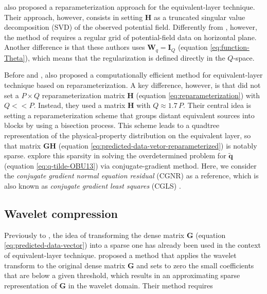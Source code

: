 \cite{mendonca-2020} also proposed a reparameterization approach for the equivalent-layer technique.
Their approach, however, consists in setting $\mathbf{H}$ as a truncated singular value decomposition
(SVD) \cite[e.g.,][p. 55]{aster_etal2019} of the observed potential field. 
Differently from \cite{oliveirajr-etal2013}, however, the method of \cite{mendonca-2020} requires 
a regular grid of potential-field data on horizontal plane.
Another difference is that these authors uses $\mathbf{W}_{q} = \mathbf{I}_{Q}$ (equation \ref{eq:function-Theta}),
which means that the regularization is defined directly in the $Q$-space.

Before \cite{oliveirajr-etal2013} and \cite{mendonca-2020}, \cite{barnes-lumley_2011} also proposed a computationally
efficient method for equivalent-layer technique based on reparameterization. 
A key difference, however, is that \cite{barnes-lumley_2011} did not set a $P \times Q$ reparameterization matrix $\mathbf{H}$
(equation \ref{eq:reparameterization}) with $Q << P$. 
Instead, they used a matrix $\mathbf{H}$ with $Q \approx 1.7 \, P$. 
Their central idea is setting a reparameterization scheme that groups distant equivalent sources into blocks by
using a bisection process. 
This scheme leads to a quadtree representation of the physical-property distribution on the equivalent layer, 
so that matrix $\mathbf{G}\mathbf{H}$ (equation \ref{eq:predicted-data-vetor-reparameterized}) is notably sparse.
\cite{barnes-lumley_2011} explore this sparsity in solving the overdetermined problem for $\tilde{\mathbf{q}}$
(equation \ref{eq:q-tilde-OBU13}) via conjugate-gradient method.
Here, we consider the \textit{conjugate gradient normal equation residual} (CGNR) 
\citet[][sec. 11.3]{golub-vanloan2013} as a reference, which is also known as \textit{conjugate gradient least squares} (CGLS) 
\cite[][p. 165]{aster_etal2019}.


\subsection{Wavelet compression}

Previously to \cite{barnes-lumley_2011}, the idea of transforming the dense matrix $\mathbf{G}$ (equation \ref{eq:predicted-data-vector}) 
into a sparse one has already been used in the context of equivalent-layer technique.
\cite{li-oldenburg_2010} proposed a method that applies the wavelet transform to the original dense matrix $\mathbf{G}$ 
and sets to zero the small coefficients that are below a given threshold, which results in an approximating
sparse representation of $\mathbf{G}$ in the wavelet domain.
Their method requires 

